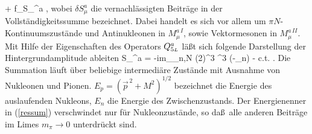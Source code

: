     \; + \;  f_\pi \delta S_\mu^{a}  \nonumber ,
\eeq
wobei $\delta S_\mu^{a}$ die vernachl\"assigten Beitr\"age in der
Vollst\"andigkeitssumme bezeichnet. Dabei handelt es sich vor allem um
$\pi N$-Kontinuumszust\"ande und Antinukleonen in $M_\mu^{a\, I}$, 
sowie Vektormesonen in $M_\mu^{a\, II}$.
Mit Hilfe der Eigenschaften des Operators $Q_{5{\scriptscriptstyle L}}^{a}$ l\"a\ss t sich folgende
Darstellung der Hintergrundamplitude ableiten \cite{AFF73}
\be
\label{ressum}
\delta S_\mu^{a} = -im_\pi \sum_{n\neq\pi,N} (2\pi)^3 \delta^3 
  (-_n) 
  \;-\; c.t. \; . 
\ee
Die Summation l\"auft \"uber beliebige intermedi\"are Zust\"ande 
mit Ausnahme von Nukleonen und Pionen. $E_p=(\vec{p}^{\,2}+M^2)^{1/2}$
bezeichnet die Energie des auslaufenden Nukleons, $E_n$ die Energie
des Zwischenzustands. Der Energienenner in (\ref{ressum}) verschwindet
nur f\"ur Nukleonzust\"ande, so da\ss\ alle anderen Beitr\"age im Limes 
$m_\pi \to 0$ unterdr\"uckt sind. 


